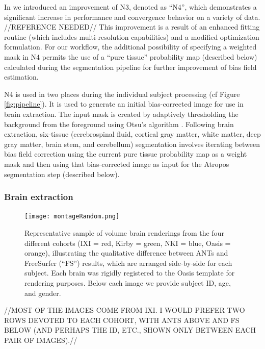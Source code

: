 In \cite{tustison2010} we introduced an improvement of N3, denoted as
``N4'', which demonstrates a significant increase in performance and convergence behavior
on a variety of data. //REFERENCE NEEDED// This improvement is a result of an enhanced
fitting routine (which includes multi-resolution capabilities) and a modified optimization 
formulation.  For our workflow, the additional possibility of specifying
a weighted mask in N4 permits the use of a ``pure tissue'' probability map 
(described below)
calculated during the segmentation pipeline for further improvement of 
bias field estimation.  

N4 is used in two places during the individual subject processing (cf Figure
\ref{fig:pipeline}).  
It is used to generate an initial bias-corrected image for use in
brain extraction.  The input mask is created by adaptively thresholding 
the background from the foreground using Otsu's algorithm \citep{otsu1979}.
Following brain extraction, six-tissue (cerebrospinal fluid, cortical gray 
matter, white matter, deep gray matter, brain stem, and cerebellum)
segmentation involves iterating
between bias field correction using the current pure tissue 
probability map as a weight mask and then using that bias-corrected image
as input for the Atropos segmentation step (described below).

\subsubsection{Brain extraction}

\begin{figure}
  \texttt{[image: montageRandom.png]}
  \caption{Representative sample of volume brain renderings from the four
  different cohorts (IXI = red, Kirby = green, NKI = blue, Oasis = orange),
  illustrating the qualitative difference between ANTs and FreeSurfer 
  (``FS'') results, which are arranged side-by-side for each subject.  Each brain was rigidly
  registered to the Oasis template for rendering purposes.  Below each image 
  we provide subject ID, age, and gender.
  }
  \label{fig:brainExtraction}
\end{figure}

//MOST OF THE IMAGES COME FROM IXI.  I WOULD PREFER TWO ROWS DEVOTED TO EACH COHORT,
 WITH ANTS ABOVE AND FS BELOW (AND PERHAPS THE ID, ETC., SHOWN ONLY BETWEEN EACH PAIR OF IMAGES).//


